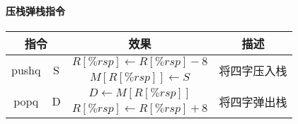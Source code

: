 \paragraph{压栈弹栈指令}
\begin{table}[H]
    \centering
    \begin{tabular}{|c c|c|c|}
        \hline
        \multicolumn{2}{|c|}{\textbf{指令}} & \textbf{效果}        & \textbf{描述}                                                \\
        \hline
        \multirow{2}{*}{pushq}            & \multirow{2}{*}{S} & $R[\%rsp] \leftarrow R[\%rsp]-8$ & \multirow{2}{*}{将四字压入栈} \\
                                          &                    & $M[R[\%rsp]] \leftarrow S$       &                         \\
        \hline
        \multirow{2}{*}{popq}             & \multirow{2}{*}{D} & $D \leftarrow M[R[\%rsp]]$       & \multirow{2}{*}{将四字弹出栈} \\
                                          &                    & $R[\%rsp] \leftarrow R[\%rsp]+8$ &                         \\
        \hline
    \end{tabular}
\end{table}

